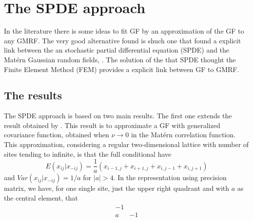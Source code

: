 \chapter{The SPDE approach}\label{ch:spde} 

In the literature there is some ideas to 
fit GF by an approximation of the GF to any GMRF. 
The very good alternative found is shuch one that 
found a explicit link between the an 
stochastic partial differential equation (SPDE) 
and the Mat\'ern Gaussian random fields, 
\cite{lindgrenRL:2011}. 
The solution of the that SPDE 
thought the Finite Element Method (FEM) 
provides a explicit link between GF to GMRF. 

\section{The \cite{lindgrenRL:2011} results} 

The SPDE approach is based on two main results. 
The first one extends the result obtained by \cite{besag:1981}. 
This result is to approximate a GF with generalized 
covariance function, obtained when $\nu \rightarrow 0$ 
in the Mat\'ern correlation function. 
This approximation, considering a regular two-dimensional 
lattice with number of sites tending to infinite, 
is that the full conditional have 
\begin{equation}
E(x_{ij}|x_{-ij}) = \frac{1}{a}(x_{i-1,j}+x_{i+1,j}+x_{i,j-1}+x_{i,j+1})
\end{equation}
and $Var(x_{ij}|x_{-ij}) = 1/a$ for $|a|>4$. 
In the representation using precision matrix, 
we have, for one single site, just the upper right 
quadrant and with $a$ as the central element, that 
\begin{equation}\label{eq:q0}
\begin{matrix}
-1  & \\
a & -1
\end{matrix}
\end{equation}


